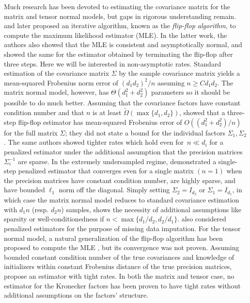 \documentclass[aos]{imsart}
\theoremstyle{definition}
\numberwithin{equation}{section}
\begin{document}
Much research has been devoted to estimating the covariance matrix for the matrix and tensor normal models, but gaps in rigorous understanding remain.
\cite{dutilleul1999mle} and later \cite{werner2008estimation} proposed an iterative algorithm, known as the \emph{flip-flop algorithm}, to compute the maximum likelihood estimator (MLE).
In the latter work, the authors also showed that the MLE is consistent and asymptotically normal, and showed the same for the estimator obtained by terminating the flip-flop after three steps.
Here we will be interested in non-asymptotic rates.
Standard estimation of the covariance matrix $\Sigma$ by the sample covariance matrix yields a mean-squared Frobenius norm error of $(d_1 d_2)^2/n$ assuming $n \geq C d_1 d_2$.
The matrix normal model, however, has $\Theta(d_1^2 + d_2^2)$ parameters so it should be possible to do much better.
Assuming that the covariance factors have constant condition number and that $n$ is at least $\tilde{\Omega}(\max\{d_1,d_2\})$, \cite{tsiligkaridis2013convergence} showed that a three-step flip-flop estimator has mean-squared Frobenius error of $O((d_1^2 + d_2^2)/n)$ for the full matrix $\Sigma$; they did not state a bound for the individual factors $\Sigma_1,\Sigma_2$.
The same authors showed tighter rates which hold even for~$n\ll d_i$ for a penalized estimator under the additional assumption that the precision matrices $\Sigma_i^{-1}$ are sparse.
In the extremely undersampled regime, \cite{zhou2014gemini} demonstrated a single-step penalized estimator that converges even for a single matrix $(n=1)$ when the precision matrices have constant condition number, are highly sparse, and have bounded $\ell_1$ norm off the diagonal.
Simply setting $\Sigma_2 = I_{d_2}$ or $\Sigma_1 = I_{d_1}$, in which case the matrix normal model reduces to standard covariance estimation with $d_1 n$ (resp. $d_2 n$) samples, shows the necessity of additional assumptions like sparsity or well-conditionedness if $n < \max\{d_1/d_2, d_2/d_1\}$. 
\cite{allen2010transposable} also considered penalized estimators for the purpose of missing data imputation.
For the tensor normal model, a natural generalization of the flip-flop algorithm has been proposed to compute the MLE \citep{mardia1993spatial,manceur2013maximum}, but its convergence was not proven.
Assuming bounded constant condition number of the true covariances and knowledge of initializers within constant Frobenius distance of the true precision matrices, \cite{sun2015nonconvex} propose an estimator with tight rates.
In both the matrix and tensor case, no estimator for the Kronecker factors has been proven to have tight rates without additional assumptions on the factors' structure.
\end{document}
